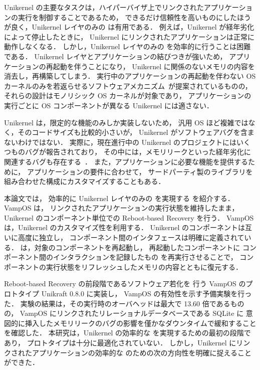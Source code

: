 Unikernel の主要なタスクは，ハイパーバイザ上でリンクされたアプリケーションの実行を制御することであるため，
できるだけ信頼性を高いものにしたほうが良く，Unikernel レイヤのみの \rr は有用である．
例えば，Unikernel が経年劣化によって停止したときに，
Unikernel にリンクされたアプリケーションは正常に動作しなくなる．
しかし，Unikernel レイヤのみの \rr を効率的に行うことは困難である．
Unikernel レイヤとアプリケーションの結びつきが強いため，
アプリケーションの再起動を伴うことになり，
Unikernel に関係のないメモリの内容を消去し，再構築してしまう．
実行中のアプリケーションの再起動を伴わない OS カーネルのみを若返らせるソフトウェアメカニズム~\cite{DepoutovitchEtAl-otherworld,TeradaEtAl-Dwarf}が提案されているものの，
それらの設計はモノリシック OS カーネルが対象であり，
アプリケーションの実行ごとに OS コンポーネントが異なる Unikernel には適さない．

Unikernel は，限定的な機能のみしか実装しないため，
汎用 OS ほど複雑ではなく，そのコードサイズも比較的小さいが，
Unikernel がソフトウェアバグを含まないわけではない．
実際に，現在進行中の Unikernel のプロジェクトにはいくつものバグが報告されており，
その中には，メモリリークといった経年劣化に関連するバグも存在する~\cite{Memleak-Unikraft,Memleak-Mirage}．
また，アプリケーションに必要な機能を提供するために，
アプリケーションの要件に合わせて，
サードパーティ製のライブラリを組み合わせた構成にカスタマイズすることもある．


本論文では，
効率的に Unikernel レイヤのみの \rr を実現する \emph{\sysname} を紹介する．
VampOS は，
リンクされたアプリケーションの実行状態を維持したまま，
Unikernel のコンポーネント単位での Reboot-based Recovery を行う．
VampOS は，Unikernel のカスタマイズ性を利用する．
Unikernel のコンポーネントは互いに高度に独立し，
コンポーネント間のインタフェースは明確に定義されている．
\sysname は，対象のコンポーネントを再起動し，
再起動したコンポーネントに
コンポーネント間のインタラクションを記録したもの
を再実行させることで，
コンポーネントの実行状態をリフレッシュしたメモリの内容とともに復元する．

Reboot-based Recovery の前段階であるソフトウェア若化を
行う VampOS のプロトタイプ Unikraft 0.8.0 に実装し，
VampOS の有効性を示す予備実験を行った．
実験の結果は，その実行時のオーバヘッドは最大で 13.60 倍であるものの，
VampOS にリンクされたリレーショナルデータベースである SQLite に
意図的に挿入したメモリリークのバグの影響を僅かなダウンタイムで緩和することを確認した．
本研究は，Unikernel の効率的な \rr を実現するための最初の段階であり，
プロトタイプは十分に最適化されていない．
しかし，Unikernel にリンクされたアプリケーションの効率的な \rr のための次の方向性を明確に捉えることができた．

